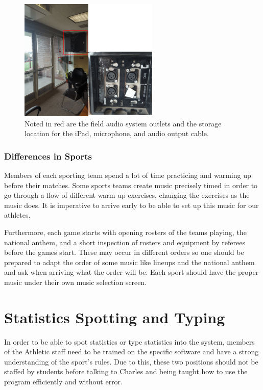 \documentclass{article}
\begin{document}
\begin{figure}[h]
\begin{center}
\includegraphics[width=250px]{images/Untitled.png}
\caption{Noted in red are the field audio system outlets and the storage location for the iPad, microphone, and audio output cable.}
\end{center}
\end{figure}

\subsubsection{Differences in Sports}
Members of each sporting team spend a lot of time practicing and warming up before their matches. Some sports teams create music precisely timed in order to go through a flow of different warm up exercises, changing the exercises as the music does. It is imperative to arrive early to be able to set up this music for our athletes.
\newline

Furthermore, each game starts with opening rosters of the teams playing, the national anthem, and a short inspection of rosters and equipment by referees before the games start. These may occur in different orders so one should be prepared to adapt the order of some music like lineups and the national anthem and ask when arriving what the order will be. Each sport should have the proper music under their own music selection screen. 

\section{Statistics Spotting and Typing}
In order to be able to spot statistics or type statistics into the system, members of the Athletic staff need to be trained on the specific software and have a strong understanding of the sport's rules. Due to this, these two positions should not be staffed by students before talking to Charles and being taught how to use the program efficiently and without error. 
\end{document}
